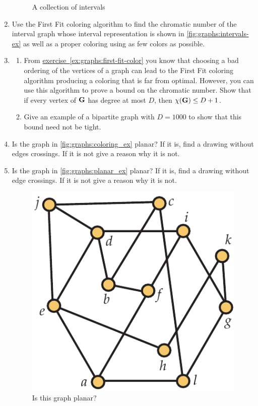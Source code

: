 \begin{enumerate}
\begin{figure}[h]
    \caption{A collection of intervals}
    \label{fig:graphs:intervals-ex}
  \end{figure}
\item Use the First Fit coloring algorithm to find the chromatic
  number of the interval graph whose interval representation is shown
  in \autoref{fig:graphs:intervals-ex} as well as a proper coloring
  using as few colors as possible.
\item 
  \begin{enumerate}
   \item From
    \hyperref[ex:graphs:first-fit-color]{exercise~\ref*{ex:graphs:first-fit-color}}
    you know that choosing a bad ordering of the vertices of a graph
    can lead to the First Fit coloring algorithm producing a coloring
    that is far from optimal. However, you can use this algorithm to
    prove a bound on the chromatic number. Show that if every vertex
    of $\mathbf{G}$ has degree at most $D$, then $\chi(\mathbf{G})\leq D+1$.
  \item Give an example of a bipartite graph with $D=1000$ to show
    that this bound need not be tight.
  \end{enumerate}
\item Is the graph in \autoref{fig:graphs:coloring_ex} planar? If it
  is, find a drawing without edges crossings. If it is not give a reason why it is
  not.
\item Is the graph in \autoref{fig:graphs:planar_ex} planar? If it
  is, find a drawing without edge crossings. If it is not give a reason why it is
  not.
  \begin{figure}[h]
    \centering
    \includegraphics[scale=0.6]{graphs-figs/planar_ex}
    \caption{Is this graph planar?}
    \label{fig:graphs:planar_ex}
  \end{figure}


\end{enumerate}
